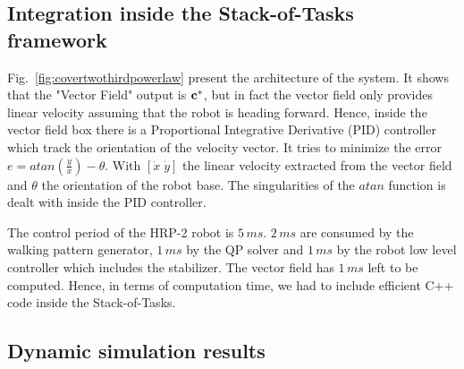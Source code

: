 



\subsection{Integration inside the Stack-of-Tasks framework}

Fig.~\ref{fig:covertwothirdpowerlaw} present the architecture of the system.
It shows that the "Vector Field" output is $\bf c^*$, but in fact the vector field only provides linear velocity assuming that the robot is heading forward.
Hence, inside the vector field box there is a Proportional Integrative Derivative (PID) controller which track the orientation of the velocity vector.
It tries to minimize the error $e=atan(\frac{\dot{y}}{\dot{x}}) - \theta$.
With $[\dot{x} \; \dot{y}]$ the linear velocity extracted from the vector field and $\theta$ the orientation of the robot base.
The singularities of the $atan$ function is dealt with inside the PID controller.

The control period of the HRP-2 robot is $5\,ms$.
$2\,ms$ are consumed by the walking pattern generator, $1\,ms$ by the QP solver and $1\,ms$ by the robot low level controller which includes the stabilizer.
The vector field has $1\,ms$ left to be computed.
Hence, in terms of computation time, we had to include efficient C++ code inside the Stack-of-Tasks.

\subsection{Dynamic simulation results}


